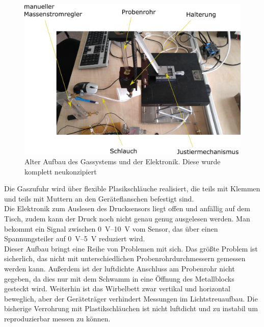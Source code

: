 \begin{figure}[h]
	\begin{center}
		\includegraphics[scale=0.7]{Altes_Wirbelbett_oben.png}
		\caption[Alter Aufbau 1]{Alter Aufbau des Gassystems und der Elektronik. Diese wurde komplett neukonzipiert}
	\end{center}
\end{figure}	


Die Gaszufuhr wird über flexible Plasikschläuche realisiert, die teils mit Klemmen und teils mit Muttern an den Geräteflanschen befestigt sind. \\
Die Elektronik zum Auslesen des Drucksensors liegt offen und anfällig auf dem Tisch, zudem kann der Druck noch nicht genau genug ausgelesen werden. Man bekommt ein Signal zwischen \SIrange{0}{10}{\volt} vom Sensor, das über einen Spannungsteiler auf \SIrange{0}{5}{\volt} reduziert wird. \\
Dieser Aufbau bringt eine Reihe von Problemen mit sich. Das größte Problem ist sicherlich, das nicht mit unterschiedlichen Probenrohrdurchmessern gemessen werden kann. Außerdem ist der luftdichte Anschluss am Probenrohr nicht gegeben, da dies nur mit dem Schwamm in eine Öffnung des Metallblocks gesteckt wird.
Weiterhin ist das Wirbelbett zwar vertikal und horizontal beweglich, aber der Geräteträger verhindert Messungen im Lichtstreuaufbau.
Die bisherige Verrohrung mit Plastikschläuchen ist nicht luftdicht und zu instabil um reproduzierbar messen zu können. \\


